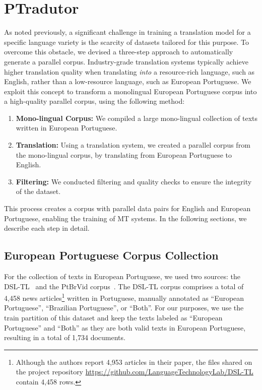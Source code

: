 \section{PTradutor}
\label{sec:ptradutor}

As noted previously, a significant challenge in training a translation model for a specific language variety is the scarcity of datasets tailored for this purpose. To overcome this obstacle, we devised a three-step approach to automatically generate a parallel corpus. Industry-grade translation systems typically achieve higher translation quality when translating \emph{into} a resource-rich language, such as English, rather than a low-resource language, such as European Portuguese. We exploit this concept to transform a monolingual European Portuguese corpus into a high-quality parallel corpus, using the following method:


\begin{enumerate}
    
    \item \textbf{Mono-lingual Corpus:} We compiled a large mono-lingual collection of texts written in European Portuguese.
    
    \item \textbf{Translation:} Using a translation system, we created a parallel corpus from the mono-lingual corpus, by translating from European Portuguese to English.
    
    \item \textbf{Filtering:} We conducted filtering and quality checks to ensure the integrity of the dataset.
\end{enumerate}


This process creates a corpus with parallel data pairs for English and European Portuguese, enabling the training of MT systems. In the following sections, we describe each step in detail.


\subsection{European Portuguese Corpus Collection}
For the collection of texts in European Portuguese, we used two sources: the DSL-TL~\cite{Zampieri2024} and the PtBrVid corpus~\cite{Sousa2025}. 
The DSL-TL corpus comprises a total of 4,458 news articles\footnote{Although the authors report 4,953 articles in their paper, the files shared on the project repository \url{https://github.com/LanguageTechnologyLab/DSL-TL} contain 4,458 rows.} written in Portuguese, manually annotated as ``European Portuguese'', ``Brazilian Portuguese'', or ``Both''. 
For our purposes, we use the train partition of this dataset and keep the texts labeled as ``European Portuguese'' and ``Both'' as they are both valid texts in European Portuguese, resulting in a total of 1,734 documents.


